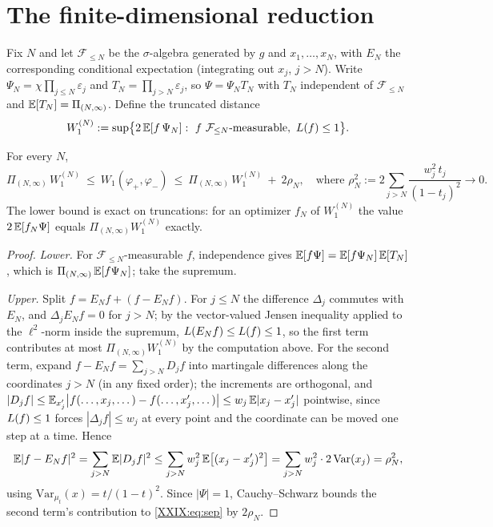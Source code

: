 \section{The finite-dimensional reduction}\label{XXIX:sec:reduction}

Fix $N$ and let $\mathcal F_{\le N}$ be the $\sigma$-algebra generated by $g$ and
$x_1,\dots,x_N$, with $E_N$ the corresponding conditional expectation (integrating out
$x_j$, $j>N$). Write $\Psi_N=\chi\prod_{j\le N}\varepsilon_j$ and
$T_N=\prod_{j>N}\varepsilon_j$, so $\Psi=\Psi_NT_N$ with $T_N$ independent of
$\mathcal F_{\le N}$ and $\mathbb{E}[T_N]=\Pi_{(N,\infty)}$. Define the truncated distance
\[
W_1^{(N)}:=\sup\bigl\{2\,\E[f\,\Psi_N]:\ f\ \mathcal F_{\le N}\text{-measurable},\
\Lip(f)\le1\bigr\}.
\]

\begin{theorem}\label{XXIX:thm:reduction}
For every $N$,
\[
\Pi_{(N,\infty)}\,W_1^{(N)}\ \le\ W_1(\varphi_+,\varphi_-)\ \le\
\Pi_{(N,\infty)}\,W_1^{(N)}\ +\ 2\rho_N,
\quad\text{where }
\rho_N^2:=2\sum_{j>N}\frac{w_j^2\,t_j}{(1-t_j)^2}\to0 .
\]
The lower bound is exact on truncations: for an optimizer $f_N$ of $W_1^{(N)}$ the value
$2\,\mathbb{E}[f_N\Psi]$ equals $\Pi_{(N,\infty)}W_1^{(N)}$ exactly.
\end{theorem}

\begin{proof}
\emph{Lower.} For $\mathcal F_{\le N}$-measurable $f$, independence gives
$\mathbb{E}[f\Psi]=\mathbb{E}[f\Psi_N]\,\mathbb{E}[T_N]$, which is $\Pi_{(N,\infty)}\,\mathbb{E}[f\Psi_N]$; take the
supremum.

\emph{Upper.} Split $f=E_Nf+(f-E_Nf)$. For $j\le N$ the difference $\Delta_j$ commutes with
$E_N$, and $\Delta_j E_Nf=0$ for $j>N$; by the vector-valued Jensen inequality applied to
the $\ell^2$-norm inside the supremum, $L(E_Nf)\le L(f)\le1$, so the first term
contributes at most $\Pi_{(N,\infty)}W_1^{(N)}$ by the computation above. For the second
term, expand $f-E_Nf=\sum_{j>N}D_jf$ into martingale differences \cite[Ch.~3]{BLM} along the coordinates
$j>N$ (in any fixed order); the increments are orthogonal, and
$|D_jf|\le\mathbb{E}_{x_j'}\bigl|f(\dots,x_j,\dots)-f(\dots,x_j',\dots)\bigr|\le
w_j\,\mathbb{E}|x_j-x_j'|$ pointwise, since $L(f)\le1$ forces $|\Delta_jf|\le w_j$ at every
point and the coordinate can be moved one step at a time. Hence
\[
\mathbb{E}|f-E_Nf|^2=\sum_{j>N}\mathbb{E}|D_jf|^2\le\sum_{j>N}w_j^2\,\mathbb{E}\bigl[(x_j-x_j')^2\bigr]
=\sum_{j>N}w_j^2\cdot2\,\mathrm{Var}(x_j)=\rho_N^2,
\]
using $\mathrm{Var}_{\mu_t}(x)=t/(1-t)^2$. Since $|\Psi|=1$, Cauchy--Schwarz bounds the
second term's contribution to \eqref{XXIX:eq:sep} by $2\rho_N$.
\end{proof}

